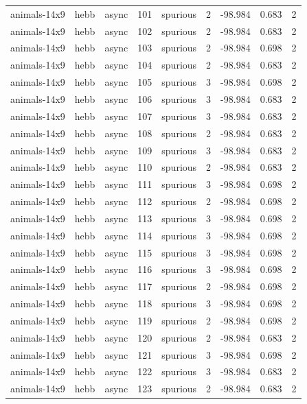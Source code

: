 \begin{tabular}{lllrlrrrr}
animals-14x9 & hebb & async & 101 & spurious & 2 & -98.984 & 0.683 & 2 \\
animals-14x9 & hebb & async & 102 & spurious & 2 & -98.984 & 0.683 & 2 \\
animals-14x9 & hebb & async & 103 & spurious & 2 & -98.984 & 0.698 & 2 \\
animals-14x9 & hebb & async & 104 & spurious & 2 & -98.984 & 0.683 & 2 \\
animals-14x9 & hebb & async & 105 & spurious & 3 & -98.984 & 0.698 & 2 \\
animals-14x9 & hebb & async & 106 & spurious & 3 & -98.984 & 0.683 & 2 \\
animals-14x9 & hebb & async & 107 & spurious & 3 & -98.984 & 0.683 & 2 \\
animals-14x9 & hebb & async & 108 & spurious & 2 & -98.984 & 0.683 & 2 \\
animals-14x9 & hebb & async & 109 & spurious & 3 & -98.984 & 0.683 & 2 \\
animals-14x9 & hebb & async & 110 & spurious & 2 & -98.984 & 0.683 & 2 \\
animals-14x9 & hebb & async & 111 & spurious & 3 & -98.984 & 0.698 & 2 \\
animals-14x9 & hebb & async & 112 & spurious & 2 & -98.984 & 0.698 & 2 \\
animals-14x9 & hebb & async & 113 & spurious & 3 & -98.984 & 0.698 & 2 \\
animals-14x9 & hebb & async & 114 & spurious & 3 & -98.984 & 0.698 & 2 \\
animals-14x9 & hebb & async & 115 & spurious & 3 & -98.984 & 0.698 & 2 \\
animals-14x9 & hebb & async & 116 & spurious & 3 & -98.984 & 0.698 & 2 \\
animals-14x9 & hebb & async & 117 & spurious & 2 & -98.984 & 0.698 & 2 \\
animals-14x9 & hebb & async & 118 & spurious & 3 & -98.984 & 0.698 & 2 \\
animals-14x9 & hebb & async & 119 & spurious & 2 & -98.984 & 0.698 & 2 \\
animals-14x9 & hebb & async & 120 & spurious & 2 & -98.984 & 0.683 & 2 \\
animals-14x9 & hebb & async & 121 & spurious & 3 & -98.984 & 0.698 & 2 \\
animals-14x9 & hebb & async & 122 & spurious & 3 & -98.984 & 0.683 & 2 \\
animals-14x9 & hebb & async & 123 & spurious & 2 & -98.984 & 0.683 & 2 \\

\end{tabular}
